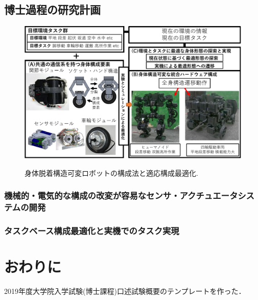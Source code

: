 \documentclass[twocolumn]{d-abst}
\begin{document}
\subsection{博士過程の研究計画}

\begin{figure}[tbh]
 \begin{center}
  \begin{minipage}{1.0\columnwidth}
    \includegraphics[width=\columnwidth]{4_matome.pdf}
   \caption{身体脱着構造可変ロボットの構成法と適応構成最適化.}
  \end{minipage}
  \label{figure:nowprinting}
 \end{center}
\end{figure}

\subsubsection{機械的・電気的な構成の改変が容易なセンサ・アクチュエータシステムの開発}

\subsubsection{タスクベース構成最適化と実機でのタスク実現}

\section{おわりに}

2019年度大学院入学試験(博士課程)口述試験概要のテンプレートを作った．



\end{document}
